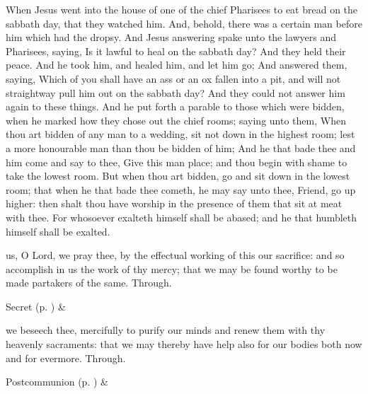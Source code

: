  When Jesus went into the house of one of the chief Pharisees to eat bread on the sabbath day, that they watched him. And, behold, there was a certain man before him which had the dropsy. And Jesus answering spake unto the lawyers and Pharisees, saying, Is it lawful to heal on the sabbath day? And they held their peace. And he took him, and healed him, and let him go; And answered them, saying, Which of you shall have an ass or an ox fallen into a pit, and will not straightway pull him out on the sabbath day? And they could not answer him again to these things. And he put forth a parable to those which were bidden, when he marked how they chose out the chief rooms; saying unto them, When thou art bidden of any man to a wedding, sit not down in the highest room; lest a more honourable man than thou be bidden of him; And he that bade thee and him come and say to thee, Give this man place; and thou begin with shame to take the lowest room. But when thou art bidden, go and sit down in the lowest room; that when he that bade thee cometh, he may say unto thee, Friend, go up higher: then shalt thou have worship in the presence of them that sit at meat with thee. For whosoever exalteth himself shall be abased; and he that humbleth himself shall be exalted.


\secret
{} us, O Lord, we pray thee, by the effectual working of this our sacrifice: and so accomplish in us the work of thy mercy; that we may be found worthy to be made partakers of the same. Through.
\begin{rubric}
     Secret  (p. \pageref{SPSaints}) \&  
\end{rubric}

\postcommunion
{} we beseech thee, mercifully to purify our minds and renew them with thy heavenly sacraments: that we may thereby have help also for our bodies both now and for evermore. Through.
\begin{rubric}
     Postcommunion  (p. \pageref{SPSaints}) \&  
\end{rubric}


